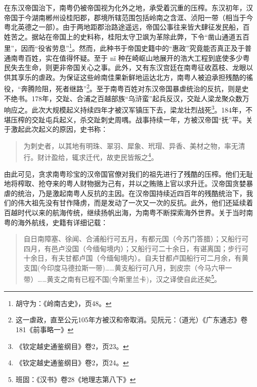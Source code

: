 在东汉帝国治下，南粤仍被帝国视为化外之地，承受着沉重的压榨。东汉初年，汉帝国于今湖南郴州设桂阳郡，郡境所辖范围包括岭南之含洭、浈阳一带（相当于今粤北英德之一部）。由于两地距郡治路途遥远，帝国公事往来皆大肆征发民船，百姓苦之。据站在帝国上的史料称，桂阳太守卫飒为革除此弊，下令“凿山通道五百里”，因而“役省劳息”\footnote{胡守为：《岭南古史》，页48。}。然而，此种书于帝国史籍中的“惠政”究竟能否真正及于普通南粤百姓，实在值得怀疑。至于 nï 种在崎岖山地展开的浩大工程到底使多少粤民失去生命，则更非帝国关心之事。此外，又有东汉宫廷在南粤征收荔枝、龙眼以供其享乐的虐政。为保证这些岭南佳果新鲜地运达北方，南粤人被迫承担残酷的徭役，“奔腾险阻，死者继路”\footnote{这一虐政，直至公元105年方被汉和帝取消。见阮元：（道光）《广东通志》卷181《前事略一》}。至于南粤百姓对东汉帝国暴虐统治的反抗，则是史不绝书。178年，交趾、合浦之百越部族“乌浒蛮”起兵反汉，交趾人梁龙聚众数万响应之。此次大规模起义持续四年才被汉军镇压下去，梁龙壮烈战死\footnote{《钦定越史通鉴纲目》卷2，页23。}。184年，不堪压榨的交趾屯兵起义，杀交趾刺史周喁。战事持续一年，方被汉帝国“抚”平。关于激起此次起义的原因，史书称：

\begin{quote}
	为刺史者，以其地有明珠、翠羽、犀象、玳瑁、异香、美材之物，率无清行。财计盈给，辄求迁代，故吏民皆叛之\footnote{《钦定越史通鉴纲目》卷2，页24。}。
\end{quote}

由此可见，贪求南粤珍宝的汉帝国官僚对我们的祖先进行了残酷的压榨。他们无耻地将榨取、抢夺来的粤人财物据为己有，并以之贿赂上官以求升迁。汉帝国贪婪暴虐的统治，乃是激起南粤人反抗的主因。在汉帝国持续近四百年的残酷统治下，我们的伟大祖先没有甘作降虏，而是发动了一次又一次的反抗。此外，他们还延续着百越时代以来的航海传统，继续扬帆出海，为南粤不断探索海外世界。关于当时南粤的海外航线，史籍有详细记载：

\begin{quote}
	自日南障塞、徐闻、合浦船行可五月，有都元国（今苏门答腊）；又船行可四月，有邑卢没国（今缅甸境内）；又船行可二十余日，有谌离国；步行可十余日，有夫甘都卢国（今缅甸境内）。自夫甘都卢国船行可二月余，有黄支国(今印度马德拉斯一带)……黄支船行可八月，到皮宗（今马六甲一带）……黄支之南有已程不国(今斯里兰卡)，汉之译使自此还矣\footnote{班固：《汉书》卷28《地理志第八下》}。
\end{quote}

